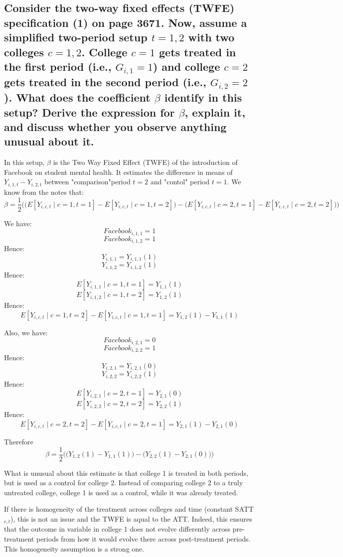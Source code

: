\documentclass{article}
\begin{document}
\subsection{Consider the two-way fixed effects (TWFE) specification (1) on page 3671. Now, assume a simplified two-period setup
\(t = 1, 2\)
with two colleges \(c = 1, 2\).
College \(c = 1\) gets treated in the first period (i.e., \(G_{i,1}= 1\)) and college \(c = 2\) gets treated in the second period (i.e., \(G_{i,2}=2\)).
What does the coefficient \(\beta\) identify in this setup? Derive the expression for \(\beta\), explain it, and discuss whether you observe anything unusual about it.}

In this setup, \(\beta\) is the Two Way Fixed Effect (TWFE) of the introduction of Facebook on student mental health. It estimates the difference in means of \(Y_{i,1,t}-Y_{i,2,t}\) between "comparison"period \(t=2\) and "contol" period \(t=1\). We know from the notes that:
\[
\beta=
\frac{1}{2}\Bigg(\Big(E[Y_{i,c,t}\mid c=1,t=1]
-E[Y_{i,c,t}\mid c=1,t=2]\Big)
-
\Big(E[Y_{i,c,t}\mid c=2,t=1]
-E[Y_{i,c,t}\mid c=2,t=2]\Big)\Bigg)
\]

We have:
\[\textit{Facebook}_{i,1,1}=1\]
\[\textit{Facebook}_{i,1,2}=1\]
Hence:
\[Y_{i,1,1}=Y_{i,1,1}(1)\]
\[Y_{i,1,2}=Y_{i,1,2}(1)\]
Hence:
\[E[Y_{i,1,1}\mid c=1,t=1]=Y_{1,1}(1)\]
\[E[Y_{i,1,2}\mid c=1,t=2]=Y_{1,2}(1)\]
Hence:
\[
E[Y_{i,c,t}\mid c=1,t=2]
-E[Y_{i,c,t}\mid c=1,t=1]
=Y_{1,2}(1)
-Y_{1,1}(1)
\]

Also, we have:
\[\textit{Facebook}_{i,2,1}=0\]
\[\textit{Facebook}_{i,2,2}=1\]
Hence:
\[Y_{i,2,1}=Y_{i,2,1}(0)\]
\[Y_{i,2,2}=Y_{i,2,2}(1)\]
Hence:
\[E[Y_{i,2,1}\mid c=2,t=1]=Y_{2,1}(0)\]
\[E[Y_{i,2,2}\mid c=2,t=2]=Y_{2,2}(1)\]
Hence:
\[
E[Y_{i,c,t}\mid c=2,t=2]
-E[Y_{i,c,t}\mid c=2,t=1]
=Y_{2,1}(1)
-Y_{2,1}(0)
\]

Therefore
\[
\beta
=
\frac{1}{2}\Bigg(
\Big(Y_{1,2}(1)-Y_{1,1}(1)\Big)
-
\Big(Y_{2,2}(1)-Y_{2,1}(0)\Big)
\Bigg)
\]

What is unusual about this estimate is that college 1 is treated in both periods, but is used as a control for college 2. Instead of comparing college 2 to a truly untreated college, college 1 is used as a control, while it was already treated.

If there is homogeneity of the treatment across colleges and time (constant SATT\(_{c,t}\)), this is not an issue and the TWFE is aqual to the ATT. Indeed, this ensures that the outcome in variable in college 1 does not evolve differently across pre-treatment periods from how it would evolve there across post-treatment periods. This homogeneity assumption is a strong one.
\end{document}
